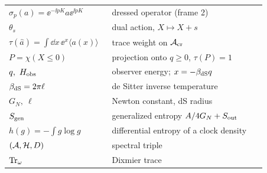 \begin{center}
\begin{longtable}{@{}p{0.38\linewidth}p{0.58\linewidth}@{}}
$\sigma_p(a)=\ee^{-\ii pK}a\ee^{\ii pK}$ & dressed operator (frame 2)\\
$\theta_s$ & dual action, $X\mapsto X+s$\\
$\tau(\hat a)=\int\dd x\,\ee^x\langle a(x)\rangle$ & trace weight on $\mathcal{A}_{\rm cr}$\\
$P=\chi(X\le0)$ & projection onto $q\ge0$, $\tau(P)=1$\\
$q,\ H_{\rm obs}$ & observer energy; $x=-\beta_{\rm dS}q$\\
$\beta_{\rm dS}=2\pi\ell$ & de Sitter inverse temperature\\
$G_N,\ \ell$ & Newton constant, dS radius\\
$S_{\mathrm{gen}}$ & generalized entropy $A/4G_N+S_{\rm out}$\\
$h(g)=-\int g\log g$ & differential entropy of a clock density\\
$(\mathcal{A},\mathcal{H},D)$ & spectral triple\\
$\operatorname{Tr}_\omega$ & Dixmier trace\\
\end{longtable}
\end{center}

